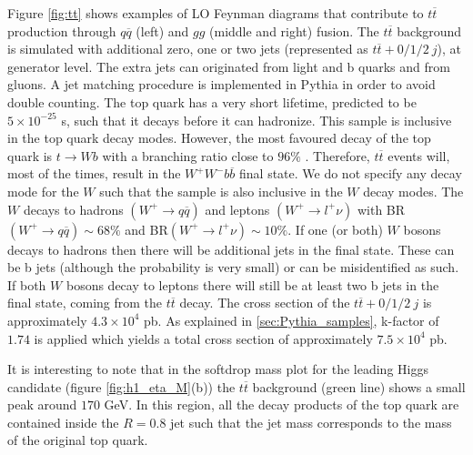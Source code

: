 Figure \ref{fig:tt} shows examples of LO Feynman diagrams that contribute to $t\overline{t}$ production through $q\overline{q}$ (left) and $gg$ (middle and right) fusion. The $t\overline{t}$ background is simulated with additional zero, one or two jets (represented as $t\overline{t}+0/1/2 ~j$), at generator level. The extra jets can originated from light and b quarks and from gluons. A jet matching procedure is implemented in Pythia in order to avoid double counting. The top quark has a very short lifetime, predicted to be $5\times 10^{-25}$ s, such that it decays before it can hadronize. This sample is inclusive in the top quark decay modes. However, the most favoured decay of the top quark is $t\rightarrow Wb$ with a branching ratio close to $96\%$ \cite{PDG2016}. Therefore, $t\overline{t}$ events will, most of the times, result in the $W^+W^-b\overline{b}$ final state. We do not specify any decay mode for the $W$ such that the sample is also inclusive in the $W$ decay modes. The $W$ decays to hadrons $(W^+\rightarrow q\overline{q})$ and leptons $(W^+\rightarrow l^+\nu)$ with BR$(W^+\rightarrow q\overline{q})\sim 68\%$ and BR$(W^+\rightarrow l^+\nu)\sim 10\%$. If one (or both) $W$ bosons decays to hadrons then there will be additional jets in the final state. These can be b jets (although the probability is very small) or can be misidentified as such. If both $W$ bosons decay to leptons there will still be at least two b jets in the final state, coming from the $t\overline{t}$ decay. The cross section of the $t\overline{t}+0/1/2 ~j$ is approximately $4.3\times 10^4$ pb. As explained in \ref{sec:Pythia_samples}, k-factor of $1.74$ is applied which yields a total cross section of approximately $7.5\times 10^{4}$ pb.

It is interesting to note that in the softdrop mass plot for the leading Higgs candidate (figure \ref{fig:h1_eta_M}(b)) the $t\overline{t}$ background (green line) shows a small peak around $170$ GeV. In this region, all the decay products of the top quark are contained inside the $R=0.8$ jet such that the jet mass corresponds to the mass of the original top quark.


